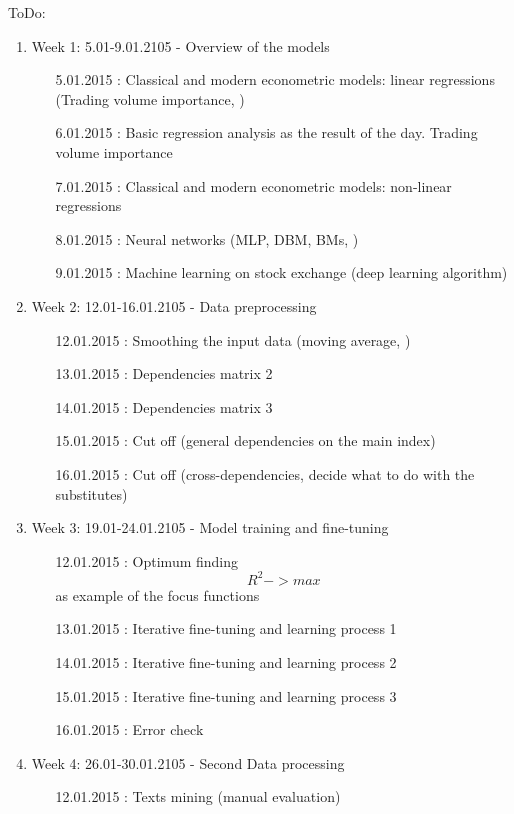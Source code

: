 \documentclass {article}
\begin{document}
ToDo:
\begin{enumerate}
	\item Week 1: 5.01-9.01.2105 - Overview of the models 
	\begin{enumerate}
		\item[5.01.2015]: Classical and modern econometric models:  linear regressions (Trading volume importance, )
		\item[6.01.2015]: Basic regression analysis as the result of the day. Trading volume importance
						  
		\item[7.01.2015]: Classical and modern econometric models:  non-linear regressions 
		\item[8.01.2015]: Neural networks (MLP, DBM, BMs, )
		\item[9.01.2015]: Machine learning on stock exchange (deep learning algorithm)
	\end{enumerate}
	\item Week 2: 12.01-16.01.2105 - Data preprocessing
	\begin{enumerate}
		\item[12.01.2015]: Smoothing the input data (moving average, )
		\item[13.01.2015]: Dependencies matrix 2
		\item[14.01.2015]: Dependencies matrix 3
		\item[15.01.2015]: Cut off (general dependencies on the main index)
		\item[16.01.2015]: Cut off (cross-dependencies, decide what to do with the substitutes)
	\end{enumerate}
	\item Week 3: 19.01-24.01.2105 - Model training and fine-tuning
	\begin{enumerate}
		\item[12.01.2015]: Optimum finding  \[ R^2 -> max \] as example of the focus functions
		\item[13.01.2015]: Iterative fine-tuning and learning process 1
		\item[14.01.2015]: Iterative fine-tuning and learning process 2
		\item[15.01.2015]: Iterative fine-tuning and learning process 3
		\item[16.01.2015]: Error check
	\end{enumerate}
	\item Week 4: 26.01-30.01.2105 - Second Data processing
	\begin{enumerate}
		\item[12.01.2015]: Texts mining (manual evaluation) 

\end{enumerate}
\end{enumerate}
\end{document}
